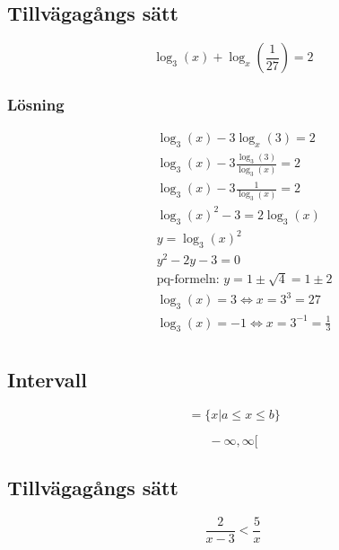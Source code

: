 \subsection{Tillvägagångs sätt}
\begin{equation}
\log_3(x) + \log_x(\frac{1}{27}) = 2
\end{equation}

\subsubsection{Lösning}
\begin{align*}
  &\quad \log_3(x) - 3 \log_x(3) = 2 \\
  &\quad  \log_3(x) - 3 \frac{\log_3(3)}{\log_3(x)} = 2 \\
  &\quad  \log_3(x) - 3 \frac{1}{\log_3(x)} = 2 \\
  &\quad  \log_3(x)^2 - 3 = 2 \log_3(x) \\
  &\quad  y = \log_3(x)^{2} \\
  &\quad  y^2 - 2y- 3 = 0 \\
  &\quad  \text{pq-formeln: } y= 1 \pm \sqrt{4} = 1 \pm 2 \\
  &\quad  \log_3(x) = 3 \Leftrightarrow x = 3^3 = 27 \\
  &\quad  \log_3(x) = -1 \Leftrightarrow x = 3^{-1} = \frac{1}{3} \\
\end{align*}


\subsection{Intervall}
\begin{equation}
[ \, a, b ] \, = \{ x | a \leq x \leq b \}
\end{equation}

\begin{equation}
[ \, a, \infty [ \,
\end{equation}
\begin{equation}
] \, -\infty, \infty [ \,
\end{equation}

\subsection{Tillvägagångs sätt}
\begin{equation}
\frac { 2 } { x - 3 } < \frac { 5 } { x }
\end{equation}


